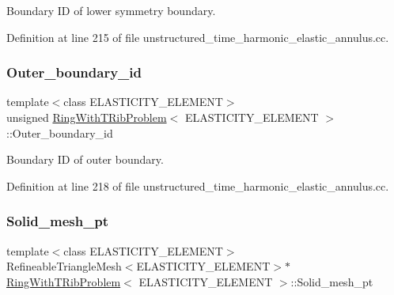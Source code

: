 Boundary ID of lower symmetry boundary. 



Definition at line 215 of file unstructured\+\_\+time\+\_\+harmonic\+\_\+elastic\+\_\+annulus.\+cc.

\mbox{\label{classRingWithTRibProblem_a88918269cac403640e2659d48210d03c}} 
\subsubsection{\texorpdfstring{Outer\+\_\+boundary\+\_\+id}{Outer\_boundary\_id}}
{\footnotesize\ttfamily template$<$class E\+L\+A\+S\+T\+I\+C\+I\+T\+Y\+\_\+\+E\+L\+E\+M\+E\+NT$>$ \\
unsigned \hyperlink{classRingWithTRibProblem}{Ring\+With\+T\+Rib\+Problem}$<$ E\+L\+A\+S\+T\+I\+C\+I\+T\+Y\+\_\+\+E\+L\+E\+M\+E\+NT $>$\+::Outer\+\_\+boundary\+\_\+id\hspace{0.3cm}{\ttfamily [private]}}



Boundary ID of outer boundary. 



Definition at line 218 of file unstructured\+\_\+time\+\_\+harmonic\+\_\+elastic\+\_\+annulus.\+cc.

\mbox{\label{classRingWithTRibProblem_a89da884cecc2d8984168817de7b1927e}} 
\subsubsection{\texorpdfstring{Solid\+\_\+mesh\+\_\+pt}{Solid\_mesh\_pt}\hspace{0.1cm}{\footnotesize\ttfamily [1/2]}}
{\footnotesize\ttfamily template$<$class E\+L\+A\+S\+T\+I\+C\+I\+T\+Y\+\_\+\+E\+L\+E\+M\+E\+NT$>$ \\
Refineable\+Triangle\+Mesh$<$E\+L\+A\+S\+T\+I\+C\+I\+T\+Y\+\_\+\+E\+L\+E\+M\+E\+NT$>$$\ast$ \hyperlink{classRingWithTRibProblem}{Ring\+With\+T\+Rib\+Problem}$<$ E\+L\+A\+S\+T\+I\+C\+I\+T\+Y\+\_\+\+E\+L\+E\+M\+E\+NT $>$\+::Solid\+\_\+mesh\+\_\+pt\hspace{0.3cm}{\ttfamily [private]}}



